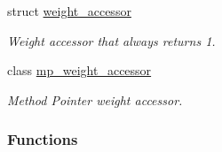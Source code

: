 \begin{DoxyCompactItemize}
struct \hyperlink{structtrsl_1_1weight__accessor}{weight\_\-accessor}
\begin{DoxyCompactList}\small\item\em Weight accessor that always returns 1. \item\end{DoxyCompactList}\item 
class \hyperlink{classtrsl_1_1mp__weight__accessor}{mp\_\-weight\_\-accessor}
\begin{DoxyCompactList}\small\item\em Method Pointer weight accessor. \item\end{DoxyCompactList}\end{DoxyCompactItemize}
\subsubsection*{Functions}
